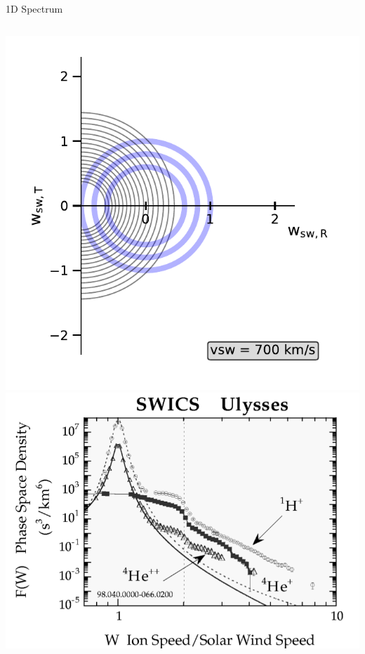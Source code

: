 \documentclass{beamer}
\begin{document}

\begin{frame}{1D Spectrum}
\begin{columns}
		\column{.1cm}
	\column{4.8cm}

	\includegraphics[scale=.3]{Pics/cov.pdf}
	\hspace{1cm}\includegraphics[scale=0.15]{Pics/sw_pui_gloeckler.png}
	
	\column{6cm}
	\vspace{.5cm}
	

\end{columns}
\end{frame}
\end{document}

